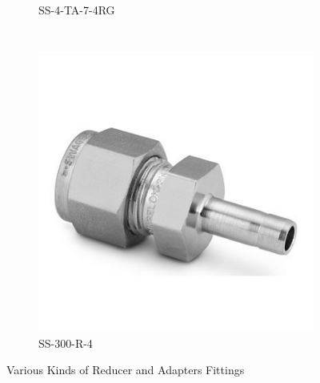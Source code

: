 \begin{figure}[H]
\begin{subfigure}[b]{0.21\textwidth}
    \caption{SS-4-TA-7-4RG}
    \end{subfigure}
    ~
    \begin{subfigure}[b]{0.21\textwidth}
    \centering
    \includegraphics[width=\textwidth]{appendix/img/interfaces/SS-300-R-4.jpg}
    \caption{SS-300-R-4}
    \end{subfigure}
    \caption{Various Kinds of Reducer and Adapters Fittings}
    \label{Appx:Reducer_Adapters_fittings}
\end{figure}

